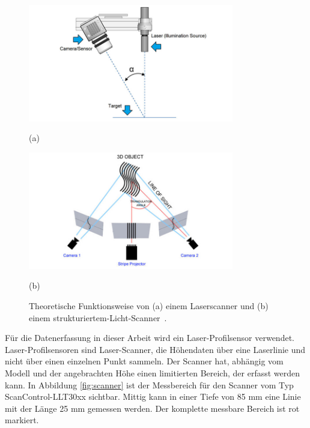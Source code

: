 \begin{figure}[H]
    \centering
    \begin{minipage}{\textwidth}
        \centering
        \includegraphics[width=0.8\textwidth]{images/laser_1.jpg} %
        \caption*{(a)} 
    \end{minipage}\hfill
    \begin{minipage}{\textwidth}
        \centering
        \includegraphics[width=0.8\textwidth]{images/structured_light_1.jpg} %
        \caption*{(b)}
    \end{minipage}\hfill
    \caption{Theoretische Funktionsweise von (a) einem Laserscanner und (b) einem 
    strukturiertem-Licht-Scanner~\cite{V..08.08.2019}.}
        \label{fig:scanning_theo}
\end{figure}

Für die Datenerfassung in dieser Arbeit wird ein Laser-Profilsensor verwendet.
Laser-Profilsensoren sind Laser-Scanner, die Höhendaten über 
eine Laserlinie und nicht über einen einzelnen Punkt sammeln. 
Der Scanner hat, abhängig vom Modell und der angebrachten Höhe einen limitierten
Bereich, der erfasst werden kann.
In Abbildung \ref{fig:scanner} ist der Messbereich für den Scanner vom Typ 
ScanControl-LLT30xx sichtbar. Mittig kann 
in einer Tiefe von 85 mm eine Linie mit der Länge 25 mm gemessen werden. 
Der komplette messbare Bereich ist rot markiert. \cite{MESSTECHNIK_2020}

